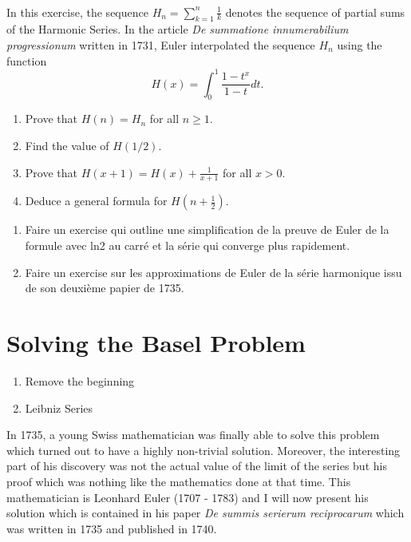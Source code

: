 \td \\


\begin{exercise}
    In this exercise, the sequence $H_n = \sum_{k=1}^{n}\frac{1}{k}$ denotes the sequence of partial sums of the Harmonic Series. In the article \textit{De summatione innumerabilium progressionum} written in 1731, Euler interpolated the sequence $H_n$ using the function
    $$H(x) = \int_{0}^{1}\frac{1-t^x}{1-t}dt.$$
    \begin{enumerate}[label=(\alph*)]
        \item Prove that $H(n) = H_n$ for all $n \geq 1$.
        \item Find the value of $H(1/2)$.
        \item Prove that $H(x + 1) = H(x) + \frac{1}{x+1}$ for all $x > 0$.
        \item Deduce a general formula for $H(n + \frac{1}{2})$. 
    \end{enumerate}
\end{exercise}

\td 

\begin{enumerate}
    \item Faire un exercise qui outline une simplification de la preuve de Euler de la formule avec ln2 au carré et la série qui converge plus rapidement.
    \item Faire un exercise sur les approximations de Euler de la série harmonique issu de son deuxième papier de 1735.
\end{enumerate}

\td 

\section{Solving the Basel Problem}

\td 

\begin{enumerate}
    \item Remove the beginning
    \item Leibniz Series
\end{enumerate}

\td 

In 1735, a young Swiss mathematician was finally able to solve this problem which turned out to have a highly non-trivial solution. Moreover, the interesting part of his discovery was not the actual value of the limit of the series but his proof which was nothing like the mathematics done at that time. This mathematician is Leonhard Euler (1707 - 1783) and I will now present his solution which is contained in his paper \textit{De summis serierum reciprocarum} \cite{eulerBaselProblem} which was written in 1735 and published in 1740.

